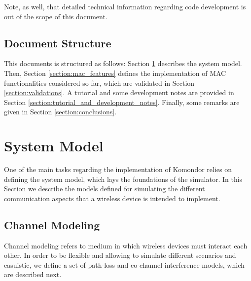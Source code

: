 \documentclass[a4paper]{article}
\begin{document}
	Note, as well, that detailed technical information regarding code development is out of the scope of this document.
	
	\subsection{Document Structure}
	\label{section:structure}
	This documents is structured as follows: Section \ref{section:system_model} describes the system model. Then, Section \ref{section:mac_features} defines the implementation of MAC functionalities considered so far, which are validated in Section \ref{section:validations}. A tutorial and some development notes are provided in Section \ref{section:tutorial_and_development_notes}. Finally, some remarks are given in Section \ref{section:conclusions}.
	
\section{System Model}
\label{section:system_model}
One of the main tasks regarding the implementation of Komondor relies on defining the system model, which lays the foundations of the simulator. In this Section we describe the models defined for simulating the different communication aspects that a wireless device is intended to implement.
	
	\subsection{Channel Modeling}
	Channel modeling refers to medium in which wireless devices must interact each other. In order to be flexible and allowing to simulate different scenarios and casuistic, we define a set of path-loss and co-channel interference models, which are described next.
	
\end{document}
